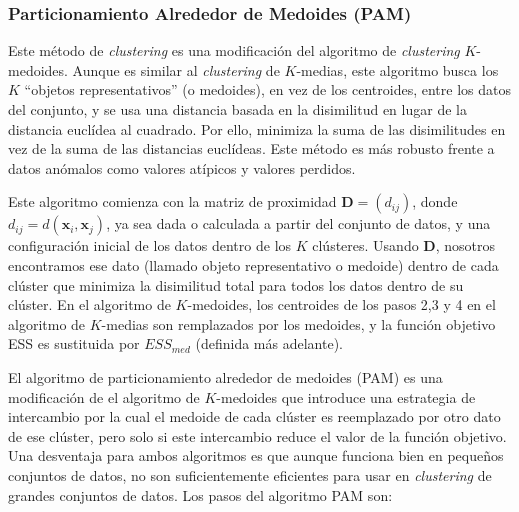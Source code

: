 \documentclass[a4paper, 20pt]{article}
\begin{document}
\subsubsection{Particionamiento Alrededor de Medoides (PAM)}

Este método de \textit{clustering} es una modificación del algoritmo de \textit{clustering} $K$-medoides. Aunque es similar al \textit{clustering} de $K$-medias, este algoritmo busca los $K$ ``objetos representativos'' (o medoides), en vez de los centroides, entre los datos del conjunto, y se usa una distancia basada en la disimilitud en lugar de la distancia euclídea al cuadrado. Por ello, minimiza la suma de las disimilitudes en vez de la suma de las distancias euclídeas. Este método es más robusto frente a datos anómalos como valores atípicos y valores perdidos.

Este algoritmo comienza con la matriz de proximidad $\textbf{D}=(d_{ij})$, donde $d_{ij}=d(\textbf{x}_i,\textbf{x}_j)$, ya sea dada o calculada a partir del conjunto de datos, y una configuración inicial de los datos dentro de los $K$ clústeres. Usando \textbf{D}, nosotros encontramos ese dato (llamado objeto representativo o medoide) dentro de cada clúster que minimiza la disimilitud total para todos los datos dentro de su clúster. En el algoritmo de $K$-medoides, los centroides de los pasos 2,3 y 4 en el algoritmo de $K$-medias son remplazados por los medoides, y la función objetivo ESS es sustituida por $ESS_{med}$ (definida más adelante).

El algoritmo de particionamiento alrededor de medoides (PAM) es una modificación de el algoritmo de $K$-medoides que introduce una estrategia de intercambio por la cual el medoide de cada clúster es reemplazado por otro dato de ese clúster, pero solo si este intercambio reduce el valor de la función objetivo. Una desventaja para ambos algoritmos es que aunque funciona bien en pequeños conjuntos de datos, no son suficientemente eficientes para usar en \textit{clustering} de grandes conjuntos de datos. Los pasos del algoritmo PAM son:
\end{document}
